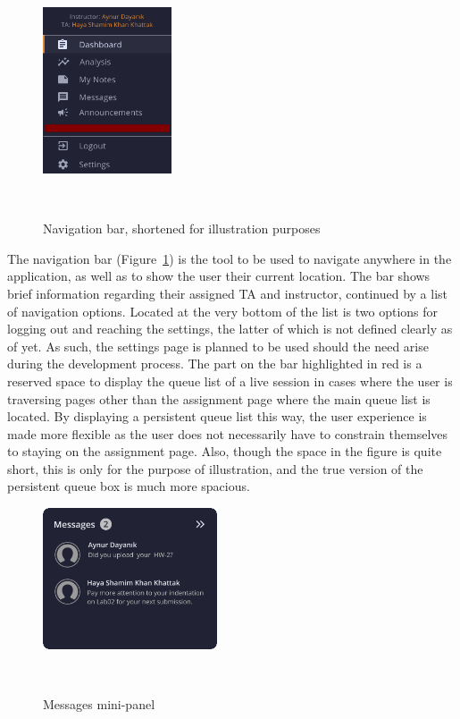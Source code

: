 \documentclass[a4paper, 12pt]{article}
\begin{document}
    \begin{figure}
        \centering
        \vspace{-15pt}
        \includegraphics[width=0.34\textwidth]{navbar_short}
        \caption{Navigation bar, shortened for illustration purposes}~\label{fig:navbar_short}
    \end{figure}

    The navigation bar (Figure~\ref{fig:navbar_short}) is the tool to be used to navigate
    anywhere in the application, as well as to show the user their current location. The bar shows brief information regarding
    their assigned TA and instructor, continued by a list of navigation options. Located at the very bottom of the list is two
    options for logging out and reaching the settings, the latter of which is not defined clearly as of yet. As such, the settings
    page is planned to be used should the need arise during the development process. The part on the bar highlighted in red is
    a reserved space to display the queue list of a live session in cases where the user is traversing pages other than the assignment page
    where the main queue list is located. By displaying a persistent queue list this way, the user experience is made more flexible as
    the user does not necessarily have to constrain themselves to staying on the assignment page. Also, though the space in the figure
    is quite short, this is only for the purpose of illustration, and the true version of the persistent queue box is much more spacious.

    \begin{figure}
        \centering
        \vspace{-15pt}
        \includegraphics[width=0.46\textwidth]{messages_panel}
        \caption{Messages mini-panel}~\label{fig:messages_panel}
    \end{figure}
\end{document}
